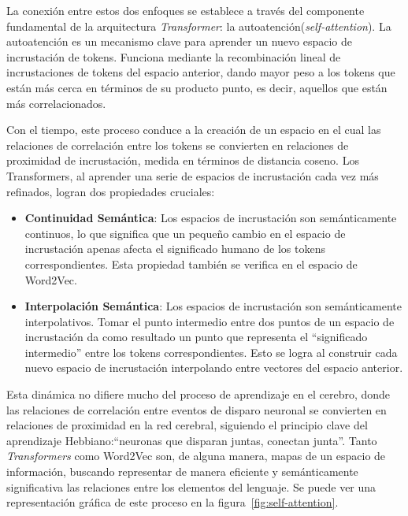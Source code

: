 La conexión entre estos dos enfoques se establece a través del componente fundamental de la arquitectura \textit{Transformer}: la autoatención(\textit{self-attention}). La autoatención es un mecanismo clave para aprender un nuevo espacio de incrustación de tokens. Funciona mediante la recombinación lineal de incrustaciones de tokens del espacio anterior, dando mayor peso a los tokens que están más cerca en términos de su producto punto, es decir, aquellos que están más correlacionados.

Con el tiempo, este proceso conduce a la creación de un espacio en el cual las relaciones de correlación entre los tokens se convierten en relaciones de proximidad de incrustación, medida en términos de distancia coseno. Los Transformers, al aprender una serie de espacios de incrustación cada vez más refinados, logran dos propiedades cruciales:

\begin{itemize}

\item \textbf{Continuidad Semántica}: Los espacios de incrustación son semánticamente continuos, lo que significa que un pequeño cambio en el espacio de incrustación apenas afecta el significado humano de los tokens correspondientes. Esta propiedad también se verifica en el espacio de Word2Vec.

\item \textbf{Interpolación Semántica}: Los espacios de incrustación son semánticamente interpolativos. Tomar el punto intermedio entre dos puntos de un espacio de incrustación da como resultado un punto que representa el ``significado intermedio'' entre los tokens correspondientes. Esto se logra al construir cada nuevo espacio de incrustación interpolando entre vectores del espacio anterior.

\end{itemize}

Esta dinámica no difiere mucho del proceso de aprendizaje en el cerebro, donde las relaciones de correlación entre eventos de disparo neuronal se convierten en relaciones de proximidad en la red cerebral, siguiendo el principio clave del aprendizaje Hebbiano:``neuronas que disparan juntas, conectan junta''. Tanto \textit{Transformers} como Word2Vec son, de alguna manera, mapas de un espacio de información, buscando representar de manera eficiente y semánticamente significativa las relaciones entre los elementos del lenguaje. Se puede ver una representación gráfica de este proceso en la figura~\ref{fig:self-attention}.

